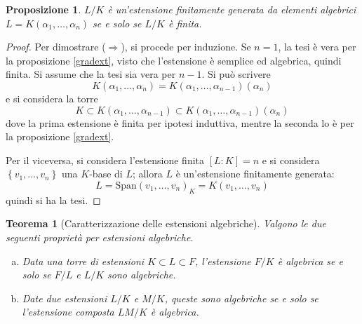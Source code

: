 \documentclass[12pt]{scrartcl}
\theoremstyle{style}
\newtheorem{prop}{Proposizione}[section]
\newtheorem{teorema}{Teorema}[section]
\numberwithin{equation}{subsection}
\begin{document}
	\begin{prop}\label{efgag}
		$L / K$ \`e un'estensione finitamente generata da elementi algebrici $L = K(\alpha_1, \ldots, \alpha _n)$ se e solo se $L / K $ \`e finita.
	\end{prop}
	\begin{proof}
		Per dimostrare ($\Rightarrow $), si procede per induzione.
		Se $n=1$, la tesi \`e vera per la proposizione \ref{gradext}, visto che l'estensione \`e semplice ed algebrica, quindi finita.
		Si assume che la tesi sia vera per $n-1$.
		Si pu\`o scrivere 
		\[
		K(\alpha _1,\ldots,\alpha _n) = K(\alpha _1,\ldots,\alpha _{n-1} ) (\alpha _n)
		\] 
		e si considera la torre
		\[
		K \subset K(\alpha _1,\ldots,\alpha _{n-1} ) \subset K(\alpha _1,\ldots,\alpha _{n-1} ) (\alpha _n)
		\] 
		dove la prima estensione \`e finita per ipotesi induttiva, mentre la seconda lo \`e per la proposizione \ref{gradext}.

		Per il viceversa, si considera l'estensione finita $[L:K]=n$ e si considera $\left\{ v_1,\ldots,v_n \right\} $ una $K$-base di $L$; allora $L$ \`e un'estensione finitamente generata:
		\[
		L = \mathrm{Span} (v_1,\ldots,v_n)_K = K(v_1,\ldots,v_n)
		\] 
		quindi si ha la tesi.
	\end{proof}
	\begin{teorema}
		[Caratterizzazione delle estensioni algebriche]
		Valgono le due seguenti propriet\`a per estensioni algebriche.
		\begin{enumerate}[(a).]
			\item Data una torre di estensioni $K \subset L \subset F$, l'estensione $F / K$ \`e algebrica se e solo se $F / L$ e $L / K$ sono algebriche.
			\item Date due estensioni $L / K$ e $M / K$, queste sono algebriche se e solo se l'estensione composta $LM / K$ \`e algebrica.
		\end{enumerate}
	\end{teorema}
\end{document}
